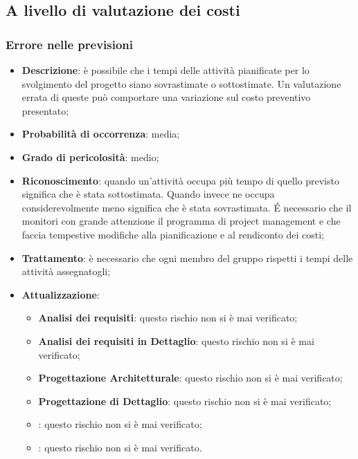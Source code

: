 	\subsection{A livello di valutazione dei costi}
	
		\subsubsection{Errore nelle previsioni}
		\begin{itemize} 
			\item \textbf{Descrizione}: è possibile che i tempi delle attività pianificate per lo svolgimento del progetto siano sovrastimate o sottostimate. Un valutazione errata di queste può comportare una variazione sul costo preventivo presentato;
			\item \textbf{Probabilità di occorrenza}: media;
			\item \textbf{Grado di pericolosità}: medio;
			\item \textbf{Riconoscimento}: quando un'attività occupa più tempo di quello previsto significa che è stata sottostimata. Quando invece ne occupa considerevolmente meno significa che è stata sovrastimata. \'E necessario che il \textit{\Res} monitori con grande attenzione il programma di project management e che faccia tempestive modifiche alla pianificazione e al rendiconto dei costi;
			\item \textbf{Trattamento}: è necessario che ogni membro del gruppo rispetti i tempi delle attività assegnatogli;
			\item \textbf{Attualizzazione}:
			\begin{itemize}
				\item \textbf{Analisi dei requisiti}: questo rischio non si è mai verificato;
				\item \textbf{Analisi dei requisiti in Dettaglio}: questo rischio non si è mai verificato;
				\item \textbf{Progettazione Architetturale}: questo rischio non si è mai verificato;
				\item \textbf{Progettazione di Dettaglio}: questo rischio non si è mai verificato;
				\item \textbf{\CO}: questo rischio non si è mai verificato;
				\item \textbf{\VV}: questo rischio non si è mai verificato. 
			\end{itemize}
		\end{itemize}